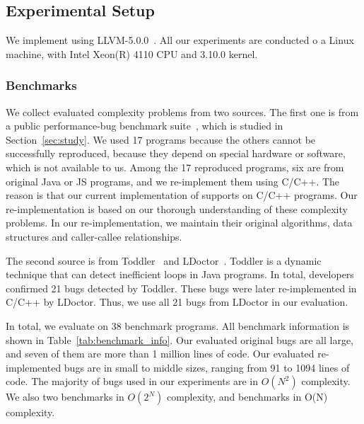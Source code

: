 \subsection{Experimental Setup}

We implement \Tool using LLVM-5.0.0~\cite{llvm}. 
All our experiments are conducted o  a Linux machine, 
with Intel Xeon(R) 4110 CPU and 3.10.0 kernel.


\subsubsection{Benchmarks}

We collect evaluated complexity problems from two sources. 
%
The first one is
from a public performance-bug benchmark 
suite~\cite{PerfBug,SongOOPSLA2014,ldoctor}, which is
studied in Section~\ref{sec:study}.
We used 17 programs because the others cannot be successfully
reproduced, because they depend on special hardware 
or software, which is not available to us. 
%
Among the 17 reproduced programs, six are from
original Java or JS programs, 
and we re-implement them using C/C++.
The reason is that our current implementation of \Tool 
supports on C/C++ programs.
Our re-implementation is based on our thorough understanding of these complexity problems.
In our re-implementation, we maintain their original algorithms, 
data structures and caller-callee relationships. 

The second source is from Toddler~\cite{Alabama} and LDoctor~\cite{ldoctor}. 
Toddler is a dynamic technique that can detect inefficient loops in Java programs.
In total, developers confirmed 21 bugs detected by Toddler. 
These bugs were later re-implemented in C/C++ by LDoctor. 
Thus, we use all  21 bugs from LDoctor in our evaluation.  

In total, we evaluate \Tool on 38 benchmark programs. 
All benchmark information is shown in Table~\ref{tab:benchmark_info}. 
Our evaluated original bugs are all large, and seven of them 
are more than 1 million lines of code.
Our evaluated re-implemented bugs are in small to middle sizes, 
ranging from 91 to 1094 lines of code. 
The majority of bugs used in our experiments are in $O(N^2)$ complexity. 
We also two benchmarks in $O(2^N)$ complexity, 
and {\color{red}{XXX}} benchmarks in O(N) complexity.

